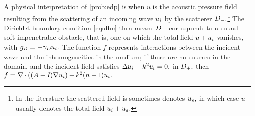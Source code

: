 A physical interpretation of \cref{prob:edp} is when $u$ is the acoustic pressure field resulting from the scattering of an incoming wave $u_{i}$ by the scatterer $D_{-}.$\footnote{In the literature the scattered field is sometimes denotes $u_{s},$ in which case $u$ usually denotes the total field $u_{i}+ u_{s}.$} The Dirichlet boundary condition \eqref{eq:dbc} then means $D_{-}$ corresponds to a sound-soft impenetrable obstacle, that is, one on which the total field $u + u_{i}$ vanishes, with $g_{D} = - \gamma_{D} u_{i}.$ The function $f$ represents interactions between the incident wave and the inhomogeneities in the medium; if there are no sources in the domain, and the incident field satisfies $\Delta u_{i} + k^2 u_{i} = 0,$ in $D_{+},$ then $f = \grad \cdot \mleft(\mleft(A-I\mright) \grad \ui\mright) + k^2 \mleft(n-1\mright)\ui.$

